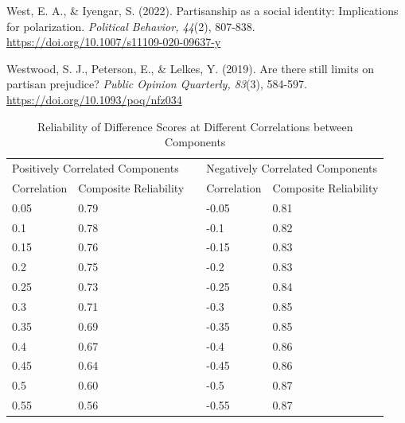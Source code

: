 \documentclass[authordate, meta]{jote-new-article}
\begin{document}
	West, E. A., \& Iyengar, S. (2022). Partisanship as a social identity: Implications for polarization. \emph{Political Behavior, 44}(2), 807-838. \url{https://doi.org/10.1007/s11109-020-09637-y} 



	Westwood, S. J., Peterson, E., \& Lelkes, Y. (2019). Are there still limits on partisan prejudice? \emph{Public Opinion Quarterly, 83}(3), 584-597. \url{https://doi.org/10.1093/poq/nfz034}



\clearpage

\onecolumn




	\begin{table}[H]
		\begin{fullwidth}
			
		\centering
		\caption{Reliability of Difference Scores at Different Correlations between Components}
		\begin{tabular}{@{} l l l l l@{}}
			\hline \multicolumn{2}{l}{Positively Correlated Components} &  &
			\multicolumn{2}{l}{Negatively Correlated Components} \\

			 Correlation & Composite Reliability &  & Correlation & Composite Reliability
			\\

			 0.05 & 0.79 &  & -0.05 & 0.81 \\

			 0.1 & 0.78 &  & -0.1 & 0.82 \\

			 0.15 & 0.76 &  & -0.15 & 0.83 \\

			 0.2 & 0.75 &  & -0.2 & 0.83 \\

			 0.25 & 0.73 &  & -0.25 & 0.84 \\

			 0.3 & 0.71 &  & -0.3 & 0.85 \\

			 0.35 & 0.69 &  & -0.35 & 0.85 \\

			 0.4 & 0.67 &  & -0.4 & 0.86 \\

			 0.45 & 0.64 &  & -0.45 & 0.86 \\

			 0.5 & 0.60 &  & -0.5 & 0.87 \\

			 0.55 & 0.56 &  & -0.55 & 0.87 \\


\end{tabular}
\end{fullwidth}
\end{table}
\end{document}
